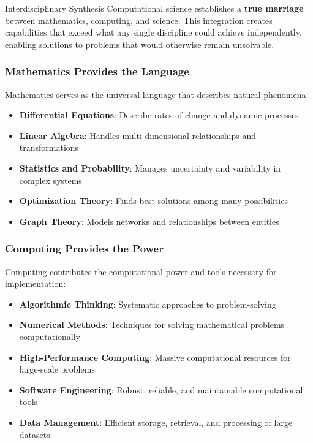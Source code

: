 \begin{highlightbox}{Interdisciplinary Synthesis}
Computational science establishes a \textbf{true marriage} between mathematics, computing, and science. This integration creates capabilities that exceed what any single discipline could achieve independently, enabling solutions to problems that would otherwise remain unsolvable.
\end{highlightbox}

\subsubsection{Mathematics Provides the Language}

Mathematics serves as the universal language that describes natural phenomena:
\begin{itemize}
    \item \textbf{Differential Equations}: Describe rates of change and dynamic processes
    \item \textbf{Linear Algebra}: Handles multi-dimensional relationships and transformations
    \item \textbf{Statistics and Probability}: Manages uncertainty and variability in complex systems
    \item \textbf{Optimization Theory}: Finds best solutions among many possibilities
    \item \textbf{Graph Theory}: Models networks and relationships between entities
\end{itemize}

\subsubsection{Computing Provides the Power}

Computing contributes the computational power and tools necessary for implementation:
\begin{itemize}
    \item \textbf{Algorithmic Thinking}: Systematic approaches to problem-solving
    \item \textbf{Numerical Methods}: Techniques for solving mathematical problems computationally
    \item \textbf{High-Performance Computing}: Massive computational resources for large-scale problems
    \item \textbf{Software Engineering}: Robust, reliable, and maintainable computational tools
    \item \textbf{Data Management}: Efficient storage, retrieval, and processing of large datasets
\end{itemize}

